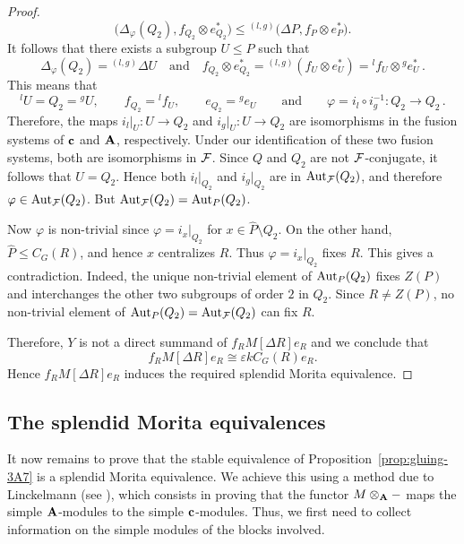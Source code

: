 \begin{proof}
\[
\bigl(\Delta_\varphi(Q_2),f_{Q_2}\otimes e_{Q_2}^*\bigr)\leq{}^{(l,g)}\bigl(\Delta P,f_P\otimes e_P^*\bigr).
\]
It follows that there exists a subgroup $U\leq P$ such that
\[
\Delta_\varphi(Q_2)={}^{(l,g)}\Delta U\quad \text{and} \quad f_{Q_2}\otimes e_{Q_2}^*={}^{(l,g)}(f_U\otimes e_U^*)={}^{l}f_U\otimes {}^{g}e_U^*\,.
\]
This means that
	\[
	{}^lU=Q_2={}^gU,\qquad f_{Q_2}={}^{l}f_U,\qquad e_{Q_2}={}^{g}e_U\qquad  \text{and}\qquad \varphi=i_l\circ i_g^{-1}:Q_2\longrightarrow Q_2\,.
	\]
Therefore, the maps $i_l|_U: U\longrightarrow Q_2$ and $i_g|_U: U\longrightarrow Q_2$ are isomorphisms in the fusion systems of ${\mathbf{c}}$ and ${\mathbf{A}}$, respectively. Under our identification of these two fusion
systems, both are isomorphisms in $\mathcal{F}$. Since $Q$ and $Q_2$ are not $\mathcal{F}$-conjugate, it follows that $U=Q_2$. Hence both $i_l|_{Q_2}$ and $i_g|_{Q_2}$ are in $\operatorname{Aut}_{\mathcal{F}}(Q_2)$,
and therefore $\varphi\in\operatorname{Aut}_{\mathcal{F}}(Q_2)$. But $\operatorname{Aut}_{\mathcal{F}}(Q_2)=\operatorname{Aut}_P(Q_2)$.


Now $\varphi$ is non-trivial since $\varphi=i_x|_{Q_2}$ for $x\in \hat{P}\setminus Q_2$. On the other hand, $\hat P\leq C_G(R)$, and hence $x$ centralizes $R$. Thus $\varphi=i_x|_{Q_2}$ fixes $R$. This gives a contradiction. Indeed, the unique non-trivial element of $\operatorname{Aut}_P(Q_2)$ fixes $Z(P)$ and interchanges the other two subgroups of order $2$ in $Q_2$. Since $R\neq Z(P)$, no non-trivial element of $\operatorname{Aut}_P(Q_2)=\operatorname{Aut}_{\mathcal{F}}(Q_2)$ can fix $R$.

Therefore, $Y$ is not a direct summand of
$f_RM[\Delta R]e_R$ and we conclude that
\[
f_RM[\Delta R]e_R\cong \varepsilon kC_G(R)e_R.
\]
Hence $f_RM[\Delta R]e_R$ induces the required splendid Morita equivalence.
\end{proof}


\vspace{2mm}
\subsection{The splendid Morita equivalences}
It now remains to prove that the stable equivalence of Proposition~\ref{prop:gluing-3A7} is a splendid Morita equivalence. We achieve this using a method due to Linckelmann (see \cite[Theorem 2.1(ii) and~(iii)]{Lin96StableEqs}), which consists in proving that the functor $M\otimes_{{\mathbf{A}}}-$ maps the simple ${\mathbf{A}}$-modules to the simple ${\mathbf{c}}$-modules. Thus, we first need to collect information on the simple modules of the blocks involved.






